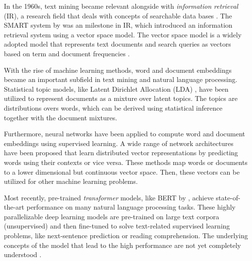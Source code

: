 In the 1960s, text mining became relevant alongside with \textit{information retrieval} (IR), a research field that deals with concepts of searchable data bases \cite{DBLP:journals/debu/Singhal01}.
The SMART system \cite{DBLP:journals/cacm/SaltonL65} by \citeauthor{DBLP:journals/cacm/SaltonL65} was an milestone in IR, which introduced an information retrieval system using a vector space model.
The vector space model is a widely adopted model that represents text documents and search queries as vectors based on term and document frequencies \cite{DBLP:journals/cacm/SaltonWY75}.

With the rise of machine learning methods, word and document embeddings became an important subfield in text mining and natural language processing.
Statistical topic models, like Latent Dirichlet Allocation (LDA) \cite{DBLP:journals/jmlr/BleiNJ03}, have been utilized to represent documents as a mixture over latent topics.
The topics are distributions overs words, which can be derived using statistical inference together with the document mixtures.

Furthermore, neural networks have been applied to compute word \cite{DBLP:journals/corr/abs-1301-3781} and document embeddings \cite{DBLP:conf/icml/LeM14} using supervised learning.
A wide range of network architectures have been proposed that learn distributed vector representations by predicting words using their contexts or vice versa.
These methods map words or documents to a lower dimensional but continuous vector space.
Then, these vectors can be utilized for other machine learning problems.

Most recently, pre-trained \textit{transformer} models, like BERT \cite{DBLP:conf/naacl/DevlinCLT19} by \citeauthor{DBLP:conf/naacl/DevlinCLT19}, achieve state-of-the-art performance on many natural language processing tasks.
These highly parallelizable deep learning models are pre-trained on large text corpora (unsupervised) and then fine-tuned to solve text-related supervised learning problems, like next-sentence prediction or reading comprehension.
The underlying concepts of the model that lead to the high performance are not yet completely understood \cite{DBLP:conf/emnlp/KovalevaRRR19}.